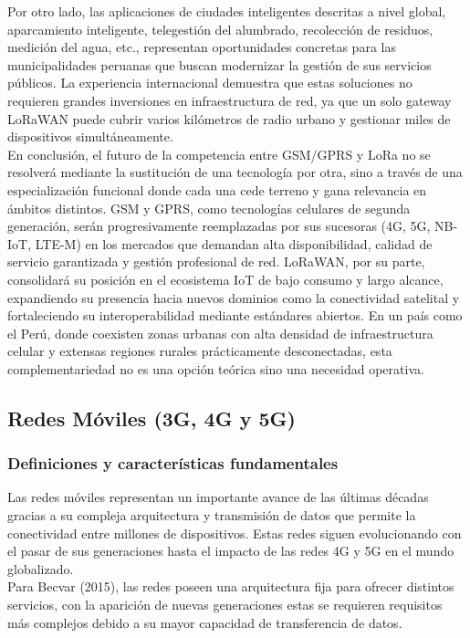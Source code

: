 \documentclass[12pt,a4paper]{article}
\begin{document}
	Por otro lado, las aplicaciones de ciudades inteligentes descritas a nivel global, aparcamiento inteligente, telegestión del alumbrado, recolección de residuos, medición del agua, etc., representan oportunidades concretas para las municipalidades peruanas que buscan modernizar la gestión de sus servicios públicos. La experiencia internacional demuestra que estas soluciones no requieren grandes inversiones en infraestructura de red, ya que un solo gateway LoRaWAN puede cubrir varios kilómetros de radio urbano y gestionar miles de dispositivos simultáneamente.\\

	En conclusión, el futuro de la competencia entre GSM/GPRS y LoRa no se resolverá mediante la sustitución de una tecnología por otra, sino a través de una especialización funcional donde cada una cede terreno y gana relevancia en ámbitos distintos. GSM y GPRS, como tecnologías celulares de segunda generación, serán progresivamente reemplazadas por sus sucesoras (4G, 5G, NB-IoT, LTE-M) en los mercados que demandan alta disponibilidad, calidad de servicio garantizada y gestión profesional de red. LoRaWAN, por su parte, consolidará su posición en el ecosistema IoT de bajo consumo y largo alcance, expandiendo su presencia hacia nuevos dominios como la conectividad satelital y fortaleciendo su interoperabilidad mediante estándares abiertos. En un país como el Perú, donde coexisten zonas urbanas con alta densidad de infraestructura celular y extensas regiones rurales prácticamente desconectadas, esta complementariedad no es una opción teórica sino una necesidad operativa.
	
	\subsection{Redes Móviles (3G, 4G y 5G)}
	
	\subsubsection{Definiciones y características fundamentales}
	
	Las redes móviles representan un importante avance de las últimas décadas gracias a su compleja arquitectura y transmisión de datos que permite la conectividad entre millones de dispositivos. Estas redes siguen evolucionando con el pasar de sus generaciones hasta el impacto de las redes 4G y 5G en el mundo globalizado.\\

	Para Becvar (2015), las redes poseen una arquitectura fija para ofrecer distintos servicios, con la aparición de nuevas generaciones estas se requieren requisitos más complejos debido a su mayor capacidad de transferencia de datos.
	
\end{document}
